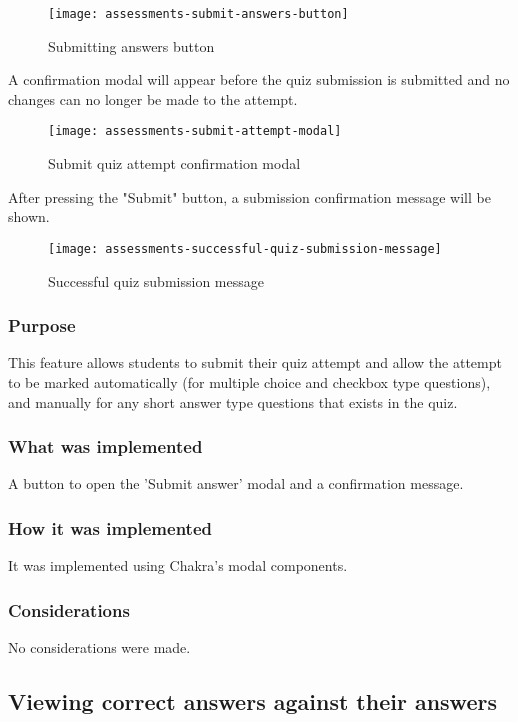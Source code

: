 \begin{figure}[h!]
	\centering
	\texttt{[image: assessments-submit-answers-button]}
	\caption{Submitting answers button}
\end{figure}

A confirmation modal will appear before the quiz submission is submitted and no changes can no longer be made to the attempt.

\begin{figure}[h!]
	\centering
	\texttt{[image: assessments-submit-attempt-modal]}
	\caption{Submit quiz attempt confirmation modal}
\end{figure}

After pressing the "Submit" button, a submission confirmation message will be shown.

\begin{figure}[h!]
	\centering
	\texttt{[image: assessments-successful-quiz-submission-message]}
	\caption{Successful quiz submission message}
\end{figure}

\subsubsection{Purpose}
This feature allows students to submit their quiz attempt and allow the attempt to be marked automatically (for multiple choice and checkbox type questions), and manually for any short answer type questions that exists in the quiz.

\subsubsection{What was implemented}
A button to open the 'Submit answer' modal and a confirmation message.

\subsubsection{How it was implemented}
It was implemented using Chakra's modal components.

\subsubsection{Considerations}
No considerations were made.

\subsection{Viewing correct answers against their answers}


